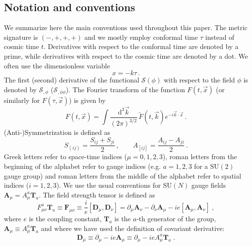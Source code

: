 \subsection{Notation and conventions \label{sec:notation}}
We summarize here the main conventions used throughout this paper. The metric signature is $(-,+,+,+)$ and we mostly employ conformal time $\tau$ instead of cosmic time $t$. Derivatives with respect to the conformal time are denoted by a prime, while derivatives with respect to the cosmic time are denoted by a dot. We often use the dimensionless variable
\begin{equation}
x = - k \tau \,.
\end{equation}
The first (second) derivative of the functional 
$\mathcal{S}(\phi)$
with respect to the field $\phi$ is denoted by 
$\mathcal{S}_{, \phi}$ ($\mathcal{S}_{, \phi \phi}$). 
The Fourier transform of the function  
$F(t,\vec{x})$
(or similarly for
$F(\tau,\vec{x})$)
is given by
\begin{equation}
F(t,\vec{x}) = \int \frac{\textrm{d}^3 \vec{k}}{\left(2 \pi\right)^{3/2}} \, \tilde{F}(t,\vec{k}) e^{-i \vec{k} \cdot \vec{x}} \,.
\end{equation}
(Anti-)Symmetrization is defined as
\begin{equation}
S_{(ij)} = \frac{S_{ij} + S_{ji}}{2} \,, \qquad A_{[ij]} = \frac{A_{ij} - A_{ji}}{2} \,.
\end{equation}
Greek letters refer to space-time indices ($\mu = 0, 1, 2, 3$), roman letters from the beginning of the alphabet refer to gauge indices (e.g. $a = 1, 2, 3$ for a $\mathrm{SU}(2)$ gauge group) and roman letters from the middle of the alphabet refer to spatial indices ($i = 1, 2, 3$). We use the usual conventions for $\mathrm{SU}(N)$ gauge fields $\mathbf{A}_\mu = A^a_\mu \mathbf{T}_a$. The field strength tensor is defined as 
\begin{equation}
	F^a_{\mu\nu} \mathbf{T}_a \equiv \mathbf{F}_{\mu\nu} \equiv \frac{i}{e}[\mathbf{D}_{\mu},\mathbf{D}_{\nu} ] = \partial_\mu \mathbf{A}_{\nu} - \partial_\nu \mathbf{A}_{\mu} - i e[\mathbf{A}_{\mu},\mathbf{A}_{\nu}]  \; ,
\end{equation}
where $e$ is the coupling constant, $\mathbf{T}_a$ is the $a$-th generator of the group, $\mathbf{A}_{\mu} \equiv A^a_{\mu} \mathbf{T}_a$ and where we have used the definition of covariant derivative:
\begin{equation}
	\mathbf{D}_{\mu} \equiv \partial_{\mu} - i e \mathbf{A}_{\mu} \equiv \partial_{\mu} - i e A^a_{\mu} \mathbf{T}_a\; .
\end{equation} 
